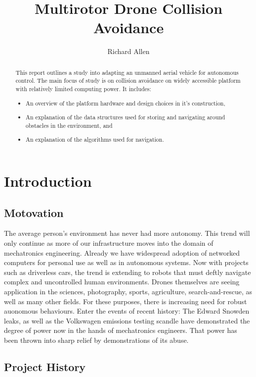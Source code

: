 \documentclass[a4paper, 12pt, titlepage]{article}
\title{Multirotor Drone Collision Avoidance}
\author{Richard Allen}
\begin{document}


\begin{abstract}
    This report outlines a study into adapting an unmanned aerial vehicle for autonomous control. The main focus of study is on collision avoidance on widely accessible platform with relatively limited computing power. 
    It includes: 
    \begin{itemize}
        \item An overview of the platform hardware and design choices in it's construction,
        \item An explanation of the data structures used for storing and navigating around obstacles in the environment, and
        \item An explanation of the algorithms used for navigation.
    \end{itemize} 
\end{abstract}

\tableofcontents
\newpage

\section{Introduction}
	\subsection{Motovation}
The average person's environment has never had more autonomy. This trend will only continue as more of our infrastructure moves into the domain of mechatronics engineering. Already we have widespread adoption of networked computers for personal use as well as in autonomous systems. Now with projects such as driverless cars, the trend is extending to robots that must deftly navigate complex and uncontrolled human environments.
Drones themselves are seeing application in the sciences, photography, sports, agriculture, search-and-rescue, as well as many other fields. For these purposes, there is increasing need for robust auonomous behaviours.
Enter the events of recent history: The Edward Snowden leaks, as well as the Volkswagen emissions testing scandle have demonstrated the degree of power now in the hands of mechatronics engineers. That power has been thrown into sharp relief by demonstrations of its abuse.

	\subsection{Project History}
\end{document}
